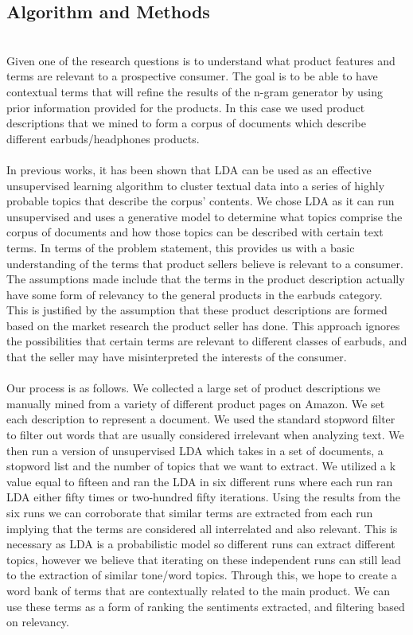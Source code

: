 \documentclass{article}
\begin{document}
\subsection{Algorithm and Methods}
\\
Given one of the research questions is to understand what product features and terms are relevant to a prospective consumer. The goal is to be able to have contextual terms that will refine the results of the n-gram generator by using prior information provided for the products. In this case we used product descriptions that we mined to form a corpus of documents which describe different earbuds/headphones products. \\
\\
In previous works, it has been shown that LDA can be used as an effective unsupervised learning algorithm to cluster textual data into a series of highly probable topics that describe the corpus' contents. We chose LDA as it can run unsupervised and uses a generative model to determine what topics comprise the corpus of documents and how those topics can be described with certain text terms. In terms of the problem statement, this provides us with a basic understanding of the terms that product sellers believe is relevant to a consumer. The assumptions made include that the terms in the product description actually have some form of relevancy to the general products in the earbuds category. This is justified by the assumption that these product descriptions are formed based on the market research the product seller has done. This approach ignores the possibilities that certain terms are relevant to different classes of earbuds, and that the seller may have misinterpreted the interests of the consumer.\\
\\
Our process is as follows. We collected a large set of product descriptions we manually mined from a variety of different product pages on Amazon. We set each description to represent a document. We used the standard stopword filter to filter out words that are usually considered irrelevant when analyzing text. We then run a version of unsupervised LDA which takes in a set of documents, a stopword list and the number of topics that we want to extract. We utilized a k value equal to fifteen and ran the LDA in six different runs where each run ran LDA either fifty times or two-hundred fifty iterations. Using the results from the six runs we can corroborate that similar terms are extracted from each run implying that the terms are considered all interrelated and also relevant. This is necessary as LDA is a probabilistic model so different runs can extract different topics, however we believe that iterating on these independent runs can still lead to the extraction of similar tone/word topics. Through this, we hope to create a word bank of terms that are contextually related to the main product. We can use these terms as a form of ranking the sentiments extracted, and filtering based on relevancy.  \\
\end{document}
